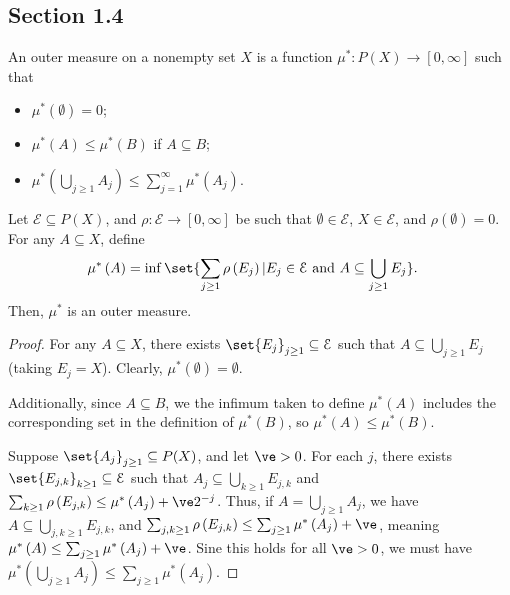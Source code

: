 \documentclass[10pt]{mypackage}
\begin{document}
\subsection{Section 1.4}%
\begin{definition}
  An outer measure on a nonempty set $X$ is a function $\mu^{\ast}\colon P(X) \rightarrow [0,\infty]$ such that
  \begin{itemize}
    \item $\mu^{\ast}\left(\emptyset\right) = 0$;
    \item $\mu^{\ast}\left(A\right)\leq \mu^{\ast}\left(B\right)$ if $A\subseteq B$;
    \item $\mu^{\ast}\left(\bigcup_{j\geq 1}A_j\right)\leq \sum_{j=1}^{\infty}\mu^{\ast}\left(A_j\right)$.
  \end{itemize}
\end{definition}
\begin{proposition}
  Let $\mathcal{E}\subseteq P(X)$, and $\rho\colon \mathcal{E}\rightarrow [0,\infty]$ be such that $\emptyset\in \mathcal{E}$, $X\in \mathcal{E}$, and $\rho\left(\emptyset\right) = 0$. For any $A\subseteq X$, define
  \begin{align*}
    \mu^{\ast}\left(A\right) &= \inf\set{\sum_{j\geq 1}\rho\left(E_j\right) | E_j\in \mathcal{E}\text{ and }A\subseteq \bigcup_{j\geq 1}E_j}.
  \end{align*}
  Then, $\mu^{\ast}$ is an outer measure.
\end{proposition}
\begin{proof}
  For any $A\subseteq X$, there exists $\set{E_j}_{j\geq 1}\subseteq \mathcal{E}$ such that $A\subseteq \bigcup_{j\geq 1}E_j$ (taking $E_j = X$). Clearly, $\mu^{\ast}\left(\emptyset \right) = \emptyset$.\newline

  Additionally, since $A\subseteq B$, we the infimum taken to define $\mu^{\ast}\left(A\right)$ includes the corresponding set in the definition of $\mu^{\ast}\left(B\right)$, so $\mu^{\ast}\left(A\right) \leq \mu^{\ast}\left(B\right)$.\newline

  Suppose $\set{A_j}_{j\geq 1}\subseteq P(X)$, and let $\ve > 0$. For each $j$, there exists $\set{E_{j,k}}_{k\geq 1}\subseteq \mathcal{E}$ such that $A_j\subseteq \bigcup_{k\geq 1}E_{j,k}$ and $\sum_{k\geq 1}\rho\left(E_{j,k}\right) \leq \mu^{\ast}\left(A_j\right) + \ve 2^{-j}$. Thus, if $A = \bigcup_{j\geq 1}A_j$, we have $A \subseteq \bigcup_{j,k\geq 1}E_{j,k}$, and $\sum_{j,k\geq 1}\rho\left(E_{j,k}\right)\leq \sum_{j\geq 1}\mu^{\ast}\left(A_j\right) + \ve$, meaning $\mu^{\ast}\left(A\right)\leq \sum_{j\geq 1}\mu^{\ast}\left(A_j\right) + \ve$. Sine this holds for all $\ve > 0$, we must have $\mu^{\ast}\left(\bigcup_{j\geq 1}A_j\right) \leq \sum_{j\geq 1}\mu^{\ast}\left(A_j\right)$.
\end{proof}
\end{document}
